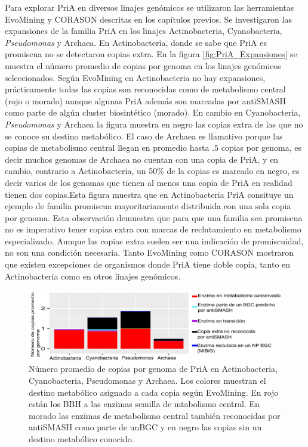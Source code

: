 \documentclass[12pt,twoside]{reedthesis}
\begin{document}
  Para explorar PriA en diversos linajes genómicos se utilizaron las
  herramientas EvoMining y CORASON descritas en los capítulos previos. Se
  investigaron las expansiones de la familia PriA en los linajes
  Actinobacteria, Cyanobacteria, \emph{Pseudomonas} y Archaea. En
  Actinobacteria, donde se sabe que PriA es promiscua no se detectaron
  copias extra. En la figura \autoref{fig:PriA_Expansiones} se muestra el
  número promedio de copias por genoma en los linajes genómicos
  seleccionados. Según EvoMining en Actinobacteria no hay expansiones,
  prácticamente todas las copias son reconocidas como de metabolismo
  central (rojo o morado) aunque algunas PriA además son marcadas por
  antiSMASH como parte de algún cluster biosintético (morado). En cambio
  en Cyanobacteria, \emph{Pseudomonas} y Archaea la figura muestra en
  negro las copias extra de las que no se conoce su destino metabólico. El
  caso de Archaea es llamativo porque las copias de metabolismo central
  llegan en promedio hasta .5 copias por genoma, es decir muchos genomas
  de Archaea no cuentan con una copia de PriA, y en cambio, contrario a
  Actinobacteria, un 50\% de la copias es marcado en negro, es decir
  varios de los genomas que tienen al menos una copia de PriA en realidad
  tienen dos copias.Esta figura muestra que en Actinobacteria PriA
  consituye un ejemplo de familia promiscua mayoritariamente distribuida
  con una sola copia por genoma. Esta observación demuestra que para que
  una familia sea promiscua no es imperativo tener copias extra con marcas
  de reclutamiento en metabolismo especializado. Aunque las copias extra
  suelen ser una indicación de promiscuidad, no son una condición
  necesaria. Tanto EvoMining como CORASON mostraron que existen
  excepciones de organismos donde PriA tiene doble copia, tanto en
  Actinobacteria como en otros linajes genómicos.
  
  \begin{figure}[h!tbp]
  \centering
  \includegraphics[angle = 0,scale = 0.8]{chapter4/PriAExpansiones.png}
  \caption[Expansiones de PriA en Actinobacteria, Cyanobacteria, Pseudomonas y Archaea]{\footnotesize{Número promedio de copias por genoma de PriA en Actinobacteria, Cyanobacteria, Pseudomonas y Archaea. Los colores muestran el destino metabólico asignado a cada copia según EvoMining. En rojo están los BBH a las enzimas semilla de mtabolismo central. En morado las enzimas de metabolismo central también reconocidas por antiSMASH como parte de unBGC y en negro las copias sin un destino metabólico conocido.}}
  \label{fig:PriA_Expansiones}
  \end{figure}
  
\end{document}
